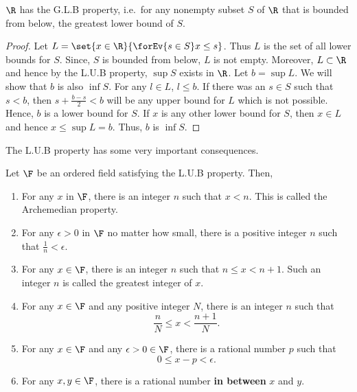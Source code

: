 \begin{Corollary}
    $\R$ has the G.L.B property, i.e.~for any nonempty subset $S$ of $\R$ that is bounded from below, the
    greatest lower bound of $S$.	
\end{Corollary}

\begin{proof}
    Let $L = \set{x \in \R}{\forEv{s\in S} x \leq s}$. Thus $L$ is the set of all lower bounds for $S$. Since,
    $S$ is bounded from below, $L$ is not empty. Moreover, $L \subset \R$ and hence by the L.U.B property,
    $\sup{S}$ exists in $\R$. Let $b = \sup{L}$. We will show that $b$ is also $\inf{S}$. For any $l \in L$,
    $l \leq b$. If there was an $s \in S$ such that $s < b$, then $s+\frac{b-s}{2} < b$ will be any upper
    bound for $L$ which is not possible. Hence, $b$ is a lower bound for $S$. If $x$ is any other lower bound
    for $S$, then $x \in L$ and hence $x \leq \sup{L} = b$. Thus, $b$ is $\inf{S}$. 
\end{proof}
The L.U.B property has some very important consequences.
\begin{Proposition}
    Let $\F$ be an ordered field satisfying the L.U.B property. Then,
    \begin{enumerate}
	\item
	    For any $x$ in $\F$, there is an integer $n$ such that $x < n$. This is called the Archemedian
	    property.
	\item
	    For any $\epsilon > 0$ in $\F$ no matter how small, there is a positive integer $n$ such 
	    that $\frac{1}{n} < \epsilon$.
	\item
	    For any $x\in \F$, there is an integer $n$ such that $n\leq x < n+1$. Such an integer $n$ is
	    called the greatest integer of $x$.
	\item
	    For any $x \in \F$ and any positive integer $N$, there is an integer $n$ such that 
	    \[\frac{n}{N} \leq x < \frac{n+1}{N}.\]
	\item
	    For any $x \in \F$ and any $\epsilon > 0 \in \F$, there is a rational number $p$ such that
	    \[0 \leq x - p < \epsilon.\]
	\item
	    For any $x,y \in \F$, there is a rational number \textbf{in between} $x$ and $y$.
    \end{enumerate}
\end{Proposition}
